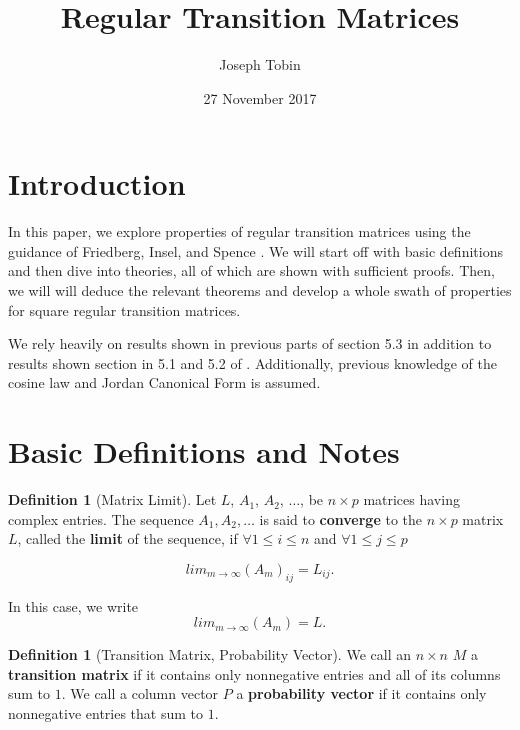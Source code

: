 \documentclass{amsart}
\title{Regular Transition Matrices}
\author{Joseph Tobin}
\date{27 November 2017}
\theoremstyle{definition}
\newtheorem{definition}[thm]{Definition}
\theoremstyle{remark}
\numberwithin{equation}{section}
\begin{document}
\maketitle





\section{Introduction}
In this paper, we explore properties of regular transition matrices using the guidance of Friedberg, Insel, and Spence \cite{friedberg2003linear}.
We will start off with basic definitions and then dive into theories, all of which are shown with sufficient proofs.
Then, we will will deduce the relevant theorems and develop a whole swath of properties for square regular transition matrices.


We rely heavily on results shown in previous parts of section 5.3 in addition to results shown section in 5.1 and 5.2 of \cite{friedberg2003linear}.
Additionally, previous knowledge of the cosine law and Jordan Canonical Form is assumed.

\section{Basic Definitions and Notes}

\begin{definition}[Matrix Limit]
Let $L$, $A_1$, $A_2$, $\ldots$, be $n \times p$ matrices having complex entries.
The sequence $A_1, A_2, \ldots$ is said to \textbf{converge} to the $n \times p$ matrix $L$, called the \textbf{limit} of the sequence, if $\forall 1 \leq i \leq n$ and $\forall 1 \leq j \leq p$

$$lim_{m \to \infty}(A_m)_{ij} = L_{ij}.$$

In this case, we write $$ lim_{m \to \infty}(A_m) = L.$$


\end{definition}


\begin{definition}[Transition Matrix, Probability Vector]
We call an $n \times n$ $M$ a \textbf{transition matrix} if it contains only nonnegative entries and all of its columns sum to $1$.
We call a column vector $P$ a \textbf{probability vector} if it contains only nonnegative entries that sum to $1$.
\end{definition}
\end{document}
